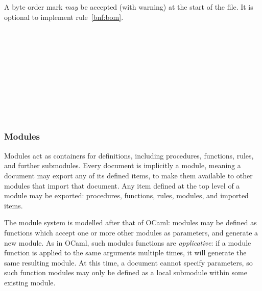 A byte order mark \emph{may} be accepted (with warning) at the start of
the file. It is optional to implement rule~\ref{bnf:bom}.

\begin{bnf}
     \\
     \\
     \\
     \\
     \\
     \\
     \\
     \\
     \\
\end{bnf}

\subsubsection{Modules}

Modules act as containers for definitions, including procedures,
functions, rules, and further submodules. Every \Trilogy{} document is
implicitly a module, meaning a document may export any of its defined items,
to make them available to other modules that import that document. Any item
defined at the top level of a module may be exported: procedures, functions,
rules, modules, and imported items.

The \Trilogy{} module system is modelled after that of OCaml: modules may
be defined as functions which accept one or more other modules as parameters,
and generate a new module. As in OCaml, such modules functions are \emph{applicative}:
if a module function is applied to the same arguments multiple times, it will
generate the same resulting module. At this time, a document cannot specify
parameters, so such function modules may only be defined as a local submodule
within some existing module.

